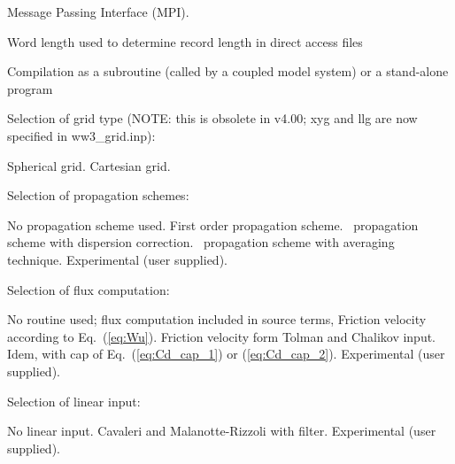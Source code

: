\begin{slist}
 {Message Passing Interface (MPI).}
\end{slist}

\noindent
Word length used to determine record length in direct access files
\begin{slist}
\end{slist}

\noindent
Compilation as a subroutine (called by a coupled model system) or a stand-alone program
\begin{slist}
\end{slist}
 
\pb \noindent
Selection of grid type (NOTE: this is obsolete in v4.00; {\sc xyg} and {\sc llg} are now specified in {\file ww3\_grid.inp}):
\begin{slist}
 {Spherical grid.}
 {Cartesian grid.}
\end{slist}

\noindent
Selection of propagation schemes:
\begin{slist}
 {No propagation scheme used.}
 {First order propagation scheme.}
 {\uq\ propagation scheme with \cite{art:BH87}
           dispersion correction.}
 {\uq\ propagation scheme with \cite{tol:OMOD02b}
          averaging technique.}
 {Experimental (user supplied).}
\end{slist}

\noindent
Selection of flux computation:
\begin{slist}
 {No routine used; flux computation included in source terms,}
 {Friction velocity according to Eq.~(\ref{eq:Wu}).}
 {Friction velocity form Tolman and Chalikov input.}
 {Idem, with cap of Eq.~(\ref{eq:Cd_cap_1}) or (\ref{eq:Cd_cap_2}).}
 {Experimental (user supplied).}
\end{slist}

\noindent
Selection of linear input:
\begin{slist}
 {No linear input.}
 {Cavaleri and Malanotte-Rizzoli with filter.}
 {Experimental (user supplied).}
\end{slist}

